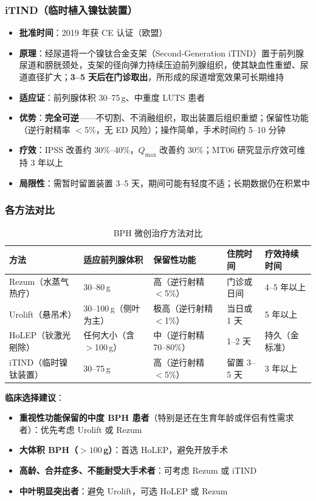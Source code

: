 \documentclass[12pt,a4paper,twoside]{ctexbook}
\begin{document}
\subsubsection{iTIND（临时植入镍钛装置）}
\begin{itemize}[leftmargin=2cm]
	\item \textbf{批准时间}：2019 年获 CE 认证（欧盟）
	\item \textbf{原理}：经尿道将一个镍钛合金支架（Second-Generation iTIND）置于前列腺尿道和膀胱颈处，支架的径向弹力持续压迫前列腺组织，使其缺血性重塑、尿道直径扩大；\textbf{3--5 天后在门诊取出}，所形成的尿道增宽效果可长期维持
	\item \textbf{适应证}：前列腺体积 30--75\,g、中重度 LUTS 患者
	\item \textbf{优势}：\textbf{完全可逆}——不切割、不消融组织，取出装置后组织重塑；保留性功能（逆行射精率 $<$5\%，无 ED 风险）；操作简单，手术时间约 5--10 分钟
	\item \textbf{疗效}：IPSS 改善约 30\%--40\%，$Q_{\max}$ 改善约 30\%；MT06 研究显示疗效可维持 3 年以上
	\item \textbf{局限性}：需暂时留置装置 3--5 天，期间可能有轻度不适；长期数据仍在积累中
\end{itemize}

\subsubsection{各方法对比}
\begin{table}[htbp]
\centering
\caption{BPH 微创治疗方法对比}
\label{tab:bph_minimal_invasive}
\begin{tabularx}{\textwidth}{@{}lXXXX@{}}
    \toprule
    \textbf{方法} & \textbf{适应前列腺体积} & \textbf{保留性功能} & \textbf{住院时间} & \textbf{疗效持续时间} \\
    \midrule
    Rezum（水蒸气热疗） & 30--80\,g & 高（逆行射精 $<$5\%） & 门诊或日间 & 4--5 年以上 \\
    Urolift（悬吊术） & 30--100\,g（侧叶为主） & 极高（逆行射精 $<$1\%） & 当日或 1 天 & 5 年以上 \\
    HoLEP（钬激光剜除） & 任何大小（含 $>$100\,g） & 中（逆行射精 70--80\%） & 1--2 天 & 持久（金标准） \\
    iTIND（临时镍钛装置） & 30--75\,g & 高（逆行射精 $<$5\%） & 留置 3--5 天 & 3 年以上 \\
    \bottomrule
\end{tabularx}
\end{table}

\textbf{临床选择建议}：
\begin{itemize}[leftmargin=2cm]
	\item \textbf{重视性功能保留的中度 BPH 患者}（特别是还在生育年龄或伴侣有性需求者）：优先考虑 Urolift 或 Rezum
	\item \textbf{大体积 BPH（$>100$\,g）}：首选 HoLEP，避免开放手术
	\item \textbf{高龄、合并症多、不能耐受大手术者}：可考虑 Rezum 或 iTIND
	\item \textbf{中叶明显突出者}：避免 Urolift，可选 HoLEP 或 Rezum
\end{itemize}
\end{document}
